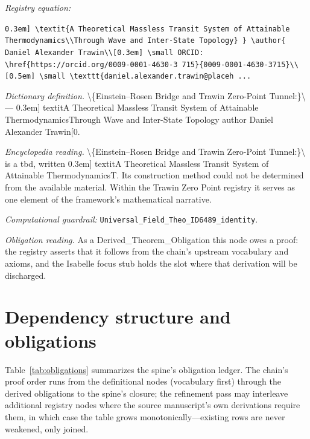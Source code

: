 \documentclass[11pt]{article}
\theoremstyle{remark}
\begin{document}
\noindent\textit{Registry equation:}\par
{\small\texttt{0.3em] \textbackslash{}textit\{A Theoretical Massless Transit System of Attainable Thermodynamics\textbackslash{}\textbackslash{}Through Wave and Inter-State Topology\} \} \textbackslash{}author\{ Daniel Alexander Trawin\textbackslash{}\textbackslash{}[0.3em] \textbackslash{}small ORCID: \textbackslash{}href\{https://orcid.org/0009-0001-4630-3 715\}\{0009-0001-4630-3715\}\textbackslash{}\textbackslash{}[0.5em] \textbackslash{}small \textbackslash{}texttt\{daniel.alexander.trawin@placeh ...}}\par\medskip
\noindent\textit{Dictionary definition.} \textbackslash{}\{Einstein--Rosen Bridge and Trawin Zero-Point Tunnel:\}\textbackslash{} --- 0.3em] textitA Theoretical Massless Transit System of Attainable ThermodynamicsThrough Wave and Inter-State Topology author Daniel Alexander Trawin[0.\par\medskip
\noindent\textit{Encyclopedia reading.} \textbackslash{}\{Einstein--Rosen Bridge and Trawin Zero-Point Tunnel:\}\textbackslash{} is a tbd, written 0.3em] textitA Theoretical Massless Transit System of Attainable ThermodynamicsT. Its construction method could not be determined from the available material. Within the Trawin Zero Point registry it serves as one element of the framework's mathematical narrative.
\par\medskip\noindent\textit{Computational guardrail:} \texttt{Universal\_Field\_Theo\_ID6489\_identity}.
\par\medskip\noindent\textit{Obligation reading.} As a Derived\_Theorem\_Obligation this node owes a proof: the registry asserts that it follows from the chain's upstream vocabulary and axioms, and the Isabelle focus stub holds the slot where that derivation will be discharged.

\section{Dependency structure and obligations}
\label{sec:dep}

Table~\ref{tab:obligations} summarizes the spine's obligation ledger. The chain's proof order runs from the definitional nodes (vocabulary first) through the derived obligations to the spine's closure; the refinement pass may interleave additional registry nodes where the source manuscript's own derivations require them, in which case the table grows monotonically---existing rows are never weakened, only joined.
\end{document}
